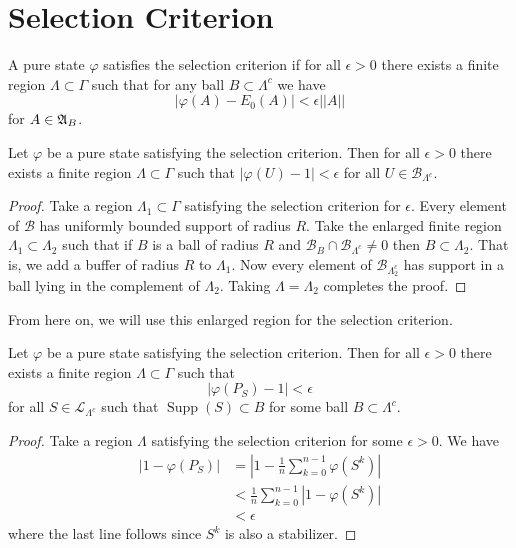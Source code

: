 \documentclass[11pt]{amsart}
\begin{document}
\section{Selection Criterion}
\begin{defn}\label{def: Selection Criterion}
    A pure state $\varphi$ satisfies the selection criterion if for all $\epsilon>0$ there exists a finite region $\Lambda\subset \Gamma$ such that for any ball $B\subset \Lambda^c$ we have 
    \[
        |\varphi(A)-E_0(A)|<\epsilon||A||
    \]
    for $A\in \mathfrak{A}_{B}$. 
\end{defn}
\begin{lem}
    Let $\varphi$ be a pure state satisfying the selection criterion. Then for all $\epsilon>0$ there exists a finite region $\Lambda\subset\Gamma$ such that $|\varphi(U)-1|<\epsilon$ for all $U\in\mathcal B_{\Lambda^c}$.
    \begin{proof}
         Take a region $\Lambda_1\subset\Gamma$ satisfying the selection criterion for $\epsilon$. Every element of $\mathcal B$ has uniformly bounded support of radius $R$. Take the enlarged finite region $\Lambda_1\subset\Lambda_2$ such that if $B$ is a ball of radius $R$ and $\mathcal B_{B}\cap\mathcal B_{\Lambda^c}\neq0$ then $B \subset\Lambda_2$. That is, we add a buffer of radius $R$ to $\Lambda_1$. Now every element of $\mathcal B_{\Lambda_2^c}$ has support in a ball lying in the complement of $\Lambda_2$. Taking $\Lambda=\Lambda_2$ completes the proof. 
    \end{proof}
\end{lem}
From here on, we will use this enlarged region for the selection criterion.
\begin{lem}
    Let $\varphi$ be a pure state satisfying the selection criterion. Then for all $\epsilon>0$ there exists a finite region $\Lambda\subset\Gamma$ such that 
    \[
        |\varphi(P_S)-1|<\epsilon
    \]
    for all $S\in\mathcal L_{\Lambda^c}$ such that $\operatorname{Supp}(S)\subset B$ for some ball $B\subset\Lambda^c$.
    \begin{proof}
        Take a region $\Lambda$ satisfying the selection criterion for some $\epsilon>0$. We have 
        \begin{align*}
            |1-\varphi(P_S)|&=|1-\frac{1}{n}\sum_{k=0}^{n-1}\varphi(S^k)| \\
            &<\frac{1}{n}\sum_{k=0}^{n-1}|1-\varphi(S^k)|\\
            &<\epsilon
        \end{align*}
        where the last line follows since $S^k$ is also a stabilizer. 
    \end{proof}
\end{lem}
\end{document}
